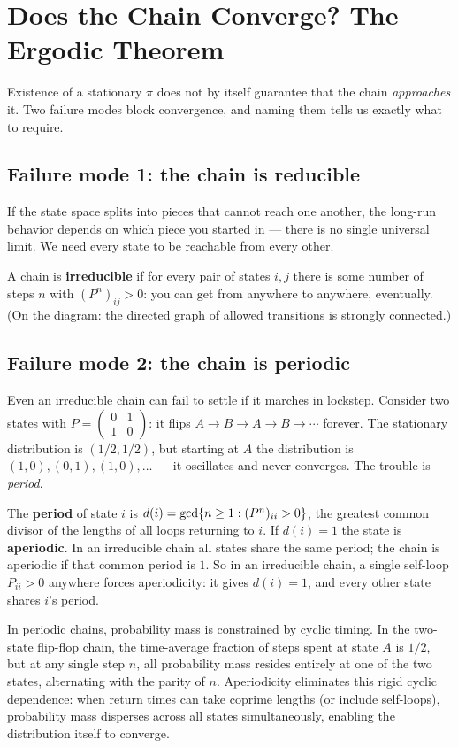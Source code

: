 \section{Does the Chain Converge? The Ergodic Theorem}
\label{ch24:ergodic}
Existence of a stationary $\pi$ does not by itself guarantee that the chain
\emph{approaches} it. Two failure modes block convergence, and naming them tells
us exactly what to require.
\subsection{Failure mode 1: the chain is reducible}
If the state space splits into pieces that cannot reach one another, the long-run
behavior depends on which piece you started in --- there is no single universal
limit. We need every state to be reachable from every other.
\begin{definition}[Irreducible]
\label{ch24:def-irreducible}
A chain is \textbf{irreducible} if for every pair of states $i,j$ there is some
number of steps $n$ with $(P^n)_{ij} > 0$: you can get from anywhere to anywhere,
eventually. (On the diagram: the directed graph of allowed transitions is
strongly connected.)
\end{definition}
\subsection{Failure mode 2: the chain is periodic}
Even an irreducible chain can fail to settle if it marches in lockstep. Consider
two states with $P = \left(\begin{smallmatrix} 0 & 1 \\ 1 & 0\end{smallmatrix}\right)$:
it flips $A \to B \to A \to B \to \cdots$ forever. The stationary distribution is
$(1/2,1/2)$, but starting at $A$ the distribution is $(1,0),(0,1),(1,0),\dots$ ---
it oscillates and never converges. The trouble is \emph{period}.
\begin{definition}
\label{ch24:def-aperiodic}
The \textbf{period} of state $i$ is $d(i) = \gcd\{n \ge 1 : (P^n)_{ii} > 0\}$,
the greatest common divisor of the lengths of all loops returning to $i$. If
$d(i)=1$ the state is \textbf{aperiodic}. In an irreducible chain all states share
the same period; the chain is aperiodic if that common period is $1$. So in an
irreducible chain, a single self-loop $P_{ii}>0$ anywhere forces aperiodicity: it
gives $d(i) = 1$, and every other state shares $i$'s period.
\end{definition}
\begin{intuitionbox}
In periodic chains, probability mass is constrained by cyclic timing. In the two-state flip-flop chain,
the time-average fraction of steps spent at state $A$ is $1/2$, but at any single step $n$,
all probability mass resides entirely at one of the two states, alternating with the parity of $n$.
Aperiodicity eliminates this rigid cyclic dependence: when return times can take coprime lengths
(or include self-loops), probability mass disperses across all states simultaneously,
enabling the distribution itself to converge.
\end{intuitionbox}
